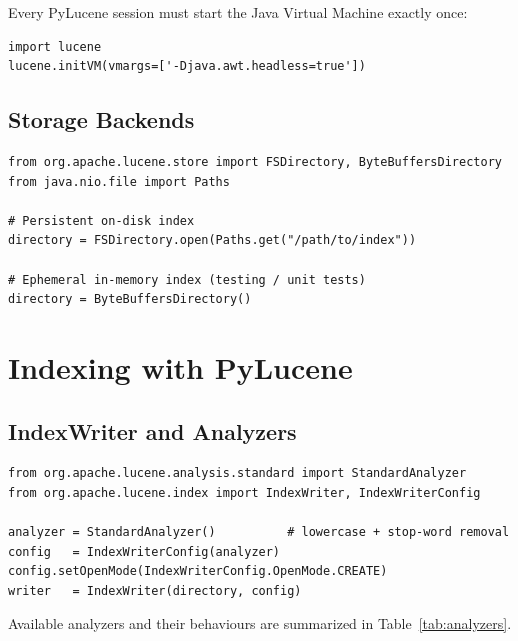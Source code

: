 \documentclass[11pt,a4paper]{article}
\begin{document}
Every PyLucene session must start the Java Virtual Machine exactly once:

\begin{lstlisting}[caption={JVM initialization}]
import lucene
lucene.initVM(vmargs=['-Djava.awt.headless=true'])
\end{lstlisting}

\subsection{Storage Backends}

\begin{lstlisting}[caption={On-disk vs in-memory index}]
from org.apache.lucene.store import FSDirectory, ByteBuffersDirectory
from java.nio.file import Paths

# Persistent on-disk index
directory = FSDirectory.open(Paths.get("/path/to/index"))

# Ephemeral in-memory index (testing / unit tests)
directory = ByteBuffersDirectory()
\end{lstlisting}

\section{Indexing with PyLucene}

\subsection{IndexWriter and Analyzers}

\begin{lstlisting}[caption={Creating an IndexWriter with StandardAnalyzer}]
from org.apache.lucene.analysis.standard import StandardAnalyzer
from org.apache.lucene.index import IndexWriter, IndexWriterConfig

analyzer = StandardAnalyzer()          # lowercase + stop-word removal
config   = IndexWriterConfig(analyzer)
config.setOpenMode(IndexWriterConfig.OpenMode.CREATE)
writer   = IndexWriter(directory, config)
\end{lstlisting}

Available analyzers and their behaviours are summarized in Table~\ref{tab:analyzers}.
\end{document}
